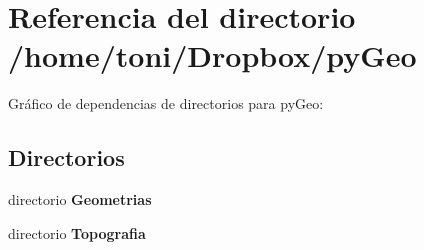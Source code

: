 \section{Referencia del directorio /home/toni/\-Dropbox/py\-Geo}
\label{dir_0734785625f6d91adae6835e38aa8da5}
Gráfico de dependencias de directorios para py\-Geo\-:
\subsection*{Directorios}
\begin{DoxyCompactItemize}
\item 
directorio {\bf Geometrias}
\item 
directorio {\bf Topografia}
\end{DoxyCompactItemize}
